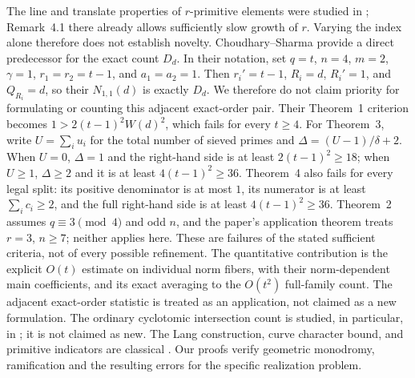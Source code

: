 \documentclass[11pt]{article}
\begin{document}
The line and translate properties of $r$-primitive elements
were studied in \cite{CK21}; Remark~4.1 there already allows
sufficiently slow growth of $r$. Varying the index alone
therefore does not establish novelty.
Choudhary--Sharma \cite[Definition~3.1 and Theorem~1]{CSh25}
provide a direct predecessor for the exact count $D_d$. In their
notation, set $q=t$, $n=4$, $m=2$, $\gamma=1$,
$r_1=r_2=t-1$, and $a_1=a_2=1$. Then
$r_i'=t-1$, $R_i=d$, $R_i'=1$, and $Q_{R_i}=d$, so their
$N_{1,1}(d)$ is exactly $D_d$. We therefore do not claim priority
for formulating or counting this adjacent exact-order pair.
Their Theorem~1 criterion becomes
$1>2(t-1)^2W(d)^2$, which fails for every $t\ge4$.
For Theorem~3, write $U=\sum_i u_i$ for the total number of
sieved primes and $\Delta=(U-1)/\delta+2$. When $U=0$,
$\Delta=1$ and the right-hand side is at least
$2(t-1)^2\ge18$; when $U\ge1$, $\Delta\ge2$ and it is
at least $4(t-1)^2\ge36$. Theorem~4 also fails for every legal
split: its positive denominator is at most $1$, its numerator is
at least $\sum_i c_i\ge2$, and the full right-hand side is at
least $4(t-1)^2\ge36$. Theorem~2 assumes $q\equiv3\pmod4$
and odd $n$, and the paper's application theorem treats $r=3$,
$n\ge7$; neither applies here. These are failures of the stated
sufficient criteria, not of every possible refinement.
The quantitative contribution is the explicit $O(t)$ estimate on
individual norm fibers, with their norm-dependent main coefficients, and
its exact averaging to the $O(t^2)$ full-family count. The adjacent
exact-order statistic is treated as an application, not claimed as a new
formulation. The ordinary cyclotomic intersection count is studied,
in particular, in \cite{KN26}; it is not claimed as new.
The Lang construction, curve character bound, and primitive
indicators are classical \cite{Katz89,FFSTV13,CKR22}.
Our proofs verify geometric monodromy, ramification and
the resulting errors for the specific realization problem.
\end{document}
